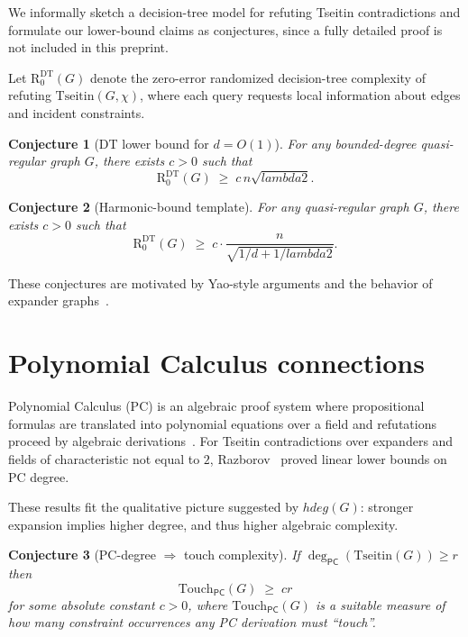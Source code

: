 \documentclass[11pt,a4paper]{article}
\def\gap{lambda2}%
\def\hdeg{hdeg}%
\newtheorem{conjecture}{Conjecture}
\theoremstyle{remark}
\newcommand{\gap}{\lambda_2}
\newcommand{\hdeg}{\widehat{\deg}}
\begin{document}
We informally sketch a decision-tree model for refuting Tseitin contradictions and
formulate our lower-bound claims as conjectures, since a fully detailed proof is not
included in this preprint.

Let $\mathrm{R}_0^{\mathrm{DT}}(G)$ denote the zero-error randomized decision-tree
complexity of refuting $\mathrm{Tseitin}(G,\chi)$, where each query requests local
information about edges and incident constraints.

\begin{conjecture}[DT lower bound for $d=O(1)$]\label{conj:dt}
For any bounded-degree quasi-regular graph $G$, there exists $c>0$ such that
\[
\mathrm{R}_0^{\mathrm{DT}}(G) \;\ge\; c\, n\sqrt{\gap}.
\]
\end{conjecture}

\begin{conjecture}[Harmonic-bound template]\label{conj:harm}
For any quasi-regular graph $G$, there exists $c>0$ such that
\[
\mathrm{R}_0^{\mathrm{DT}}(G)
\;\ge\;
c \cdot \frac{n}{\sqrt{1/d + 1/\gap}}.
\]
\end{conjecture}

These conjectures are motivated by Yao-style arguments and the behavior of
expander graphs~\cite{HooryLinialWigderson}.

\section{Polynomial Calculus connections}

Polynomial Calculus (PC) is an algebraic proof system where propositional formulas
are translated into polynomial equations over a field and refutations proceed by
algebraic derivations~\cite{Razborov1998,KrajicekBook}. For Tseitin contradictions
over expanders and fields of characteristic not equal to $2$, Razborov~\cite{Razborov1998}
proved linear lower bounds on PC degree.

These results fit the qualitative picture suggested by $\hdeg(G)$: stronger expansion
implies higher degree, and thus higher algebraic complexity.

\begin{conjecture}[PC-degree $\Rightarrow$ touch complexity]\label{conj:pc-touch}
If $\deg_{\mathsf{PC}}(\mathrm{Tseitin}(G)) \ge r$ then
\[
\mathrm{Touch}_{\mathsf{PC}}(G) \;\ge\; c r
\]
for some absolute constant $c>0$, where $\mathrm{Touch}_{\mathsf{PC}}(G)$ is a
suitable measure of how many constraint occurrences any PC derivation must ``touch''.
\end{conjecture}
\end{document}

